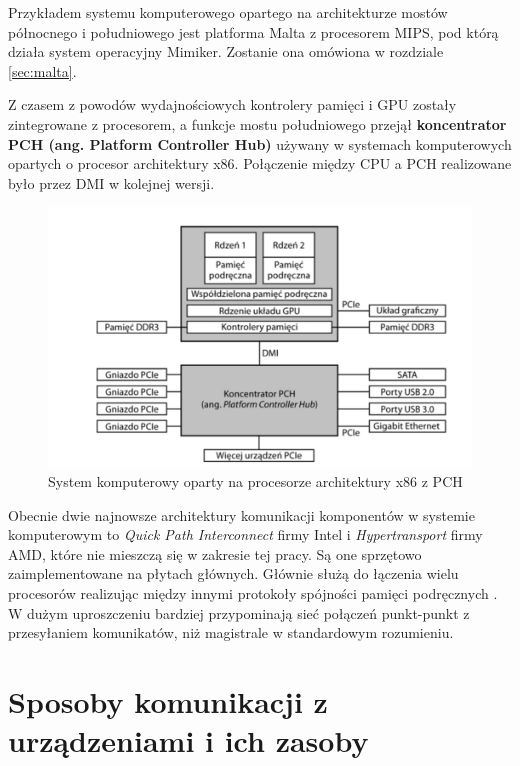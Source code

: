 \documentclass[shortabstract,inz]{iithesis}
\begin{document}
Przykładem systemu komputerowego opartego na
architekturze mostów północnego i południowego jest platforma Malta z
procesorem MIPS, pod którą działa system operacyjny Mimiker. Zostanie
ona omówiona w rozdziale \ref{sec:malta}.

Z czasem z powodów wydajnościowych kontrolery pamięci i GPU zostały
zintegrowane z procesorem, a funkcje mostu południowego przejął
\textbf{koncentrator PCH (ang. Platform Controller Hub)} używany w systemach komputerowych opartych o procesor 
architektury x86. Połączenie między CPU a PCH realizowane było przez DMI w kolejnej wersji.

\begin{figure}
  \begin{center}
    \includegraphics[width=\linewidth]{newer}
  \caption{System komputerowy oparty na procesorze architektury x86 z PCH \cite{image:pch}}
\end{center}
\end{figure}


Obecnie dwie najnowsze architektury komunikacji komponentów
w systemie komputerowym to \textit{Quick Path Interconnect} \cite{quickpathinterconnect} firmy Intel
i \textit{Hypertransport} \cite{hypertransport} firmy AMD, które nie mieszczą się w zakresie
tej pracy. Są one sprzętowo zaimplementowane na płytach głównych. 
Głównie służą do łączenia wielu procesorów realizując między innymi protokoły spójności pamięci podręcznych \cite{cache_coherence}.
W dużym uproszczeniu bardziej przypominają sieć połączeń punkt-punkt \cite{wiki:point_point} z przesyłaniem
komunikatów, niż magistrale w standardowym rozumieniu.


\chapter{Sposoby komunikacji z urządzeniami i ich zasoby}
\end{document}
